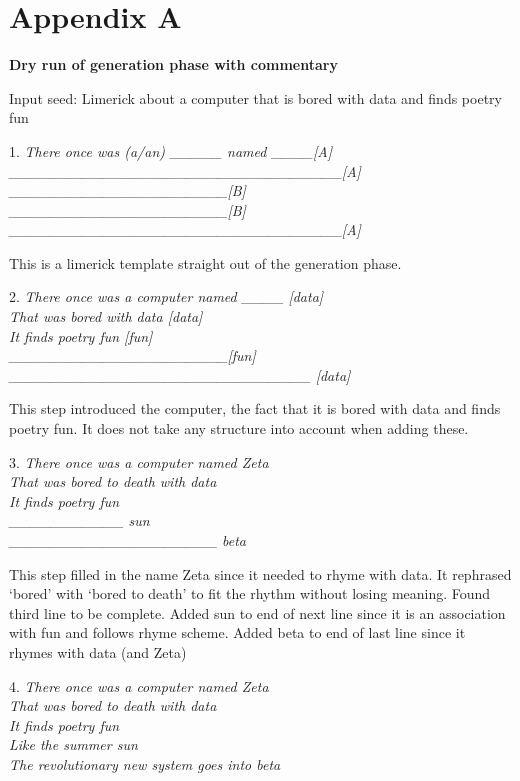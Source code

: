 \chapter{Appendix A}

\textbf{Dry run of generation phase with commentary}

Input seed: Limerick about a computer that is bored with data and finds poetry fun

1. 
\textit{There once was (a/an) \_\_\_\_\_ named \_\_\_\_[A]\\
\_\_\_\_\_\_\_\_\_\_\_\_\_\_\_\_\_\_\_\_\_\_\_\_\_\_\_\_\_\_\_\_[A]\\
\_\_\_\_\_\_\_\_\_\_\_\_\_\_\_\_\_\_\_\_\_[B]\\
\_\_\_\_\_\_\_\_\_\_\_\_\_\_\_\_\_\_\_\_\_[B]\\
\_\_\_\_\_\_\_\_\_\_\_\_\_\_\_\_\_\_\_\_\_\_\_\_\_\_\_\_\_\_\_\_[A]}

This is a limerick template straight out of the generation phase.

2.
\textit{There once was a computer named \_\_\_\_ [data]\\
That was bored with data [data]\\
It finds poetry fun [fun]\\
\_\_\_\_\_\_\_\_\_\_\_\_\_\_\_\_\_\_\_\_\_[fun]\\
\_\_\_\_\_\_\_\_\_\_\_\_\_\_\_\_\_\_\_\_\_\_\_\_\_\_\_\_\_ [data]}

This step introduced the computer, the fact that it is bored with data and finds poetry fun. It does not take any structure into account when adding these.

3.
\textit{There once was a computer named Zeta\\
That was bored to death with data\\
It finds poetry fun\\
\_\_\_\_\_\_\_\_\_\_\_ sun\\
\_\_\_\_\_\_\_\_\_\_\_\_\_\_\_\_\_\_\_\_ beta}

This step filled in the name Zeta since it needed to rhyme with data. 
It rephrased ‘bored’ with ‘bored to death’ to fit the rhythm without losing meaning. 
Found third line to be complete.
Added sun to end of next line since it is an association with fun and follows rhyme scheme.
Added beta to end of last line since it rhymes with data (and Zeta)

4.
\textit{There once was a computer named Zeta\\
That was bored to death with data\\
It finds poetry fun\\
Like the summer sun\\
The revolutionary new system goes into beta}

